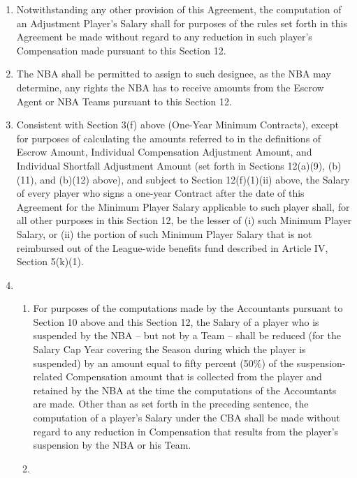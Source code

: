 \documentclass[
]{book}
\providecommand{\tightlist}{%
  \setlength{\itemsep}{0pt}\setlength{\parskip}{0pt}}
\begin{document}
\begin{enumerate}
  \begin{enumerate}
  \def\labelenumii{(\arabic{enumii})}
  \item
    Notwithstanding any other provision of this Agreement, the computation of an Adjustment Player's Salary shall for purposes of the rules set forth in this Agreement be made without regard to any reduction in such player's Compensation made pursuant to this Section 12.
  \item
    The NBA shall be permitted to assign to such designee, as the NBA may determine, any rights the NBA has to receive amounts from the Escrow Agent or NBA Teams pursuant to this Section 12.
  \item
    Consistent with Section 3(f) above (One-Year Minimum Contracts), except for purposes of calculating the amounts referred to in the definitions of Escrow Amount, Individual Compensation Adjustment Amount, and Individual Shortfall Adjustment Amount (set forth in Sections 12(a)(9), (b)(11), and (b)(12) above), and subject to Section 12(f)(1)(ii) above, the Salary of every player who signs a one-year Contract after the date of this Agreement for the Minimum Player Salary applicable to such player shall, for all other purposes in this Section 12, be the lesser of (i) such Minimum Player Salary, or (ii) the portion of such Minimum Player Salary that is not reimbursed out of the League-wide benefits fund described in Article IV, Section 5(k)(1).
  \item
    \begin{enumerate}
    \def\labelenumiii{(\roman{enumiii})}
    \tightlist
    \item
      For purposes of the computations made by the Accountants pursuant to Section 10 above and this Section 12, the Salary of a player who is suspended by the NBA -- but not by a Team -- shall be reduced (for the Salary Cap Year covering the Season during which the player is suspended) by an amount equal to fifty percent (50\%) of the suspension-related Compensation amount that is collected from the player and retained by the NBA at the time the computations of the Accountants are made. Other than as set forth in the preceding sentence, the computation of a player's Salary under the CBA shall be made without regard to any reduction in Compensation that results from the player's suspension by the NBA or his Team.
    \item

\end{enumerate}
\end{enumerate}
\end{enumerate}
\end{document}
